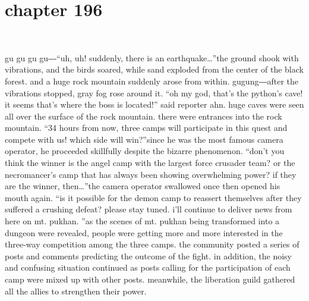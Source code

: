 \section{chapter 196}

                             




gu gu gu gu―“uh, uh! suddenly, there is an earthquake…”the ground shook with vibrations, and the birds soared, while sand exploded from the center of the black forest.
 and a huge rock mountain suddenly arose from within.
gugung―after the vibrations stopped, gray fog rose around it.
“oh my god, that’s the python’s cave! it seems that’s where the boss is located!” said reporter ahn.
huge caves were seen all over the surface of the rock mountain.
there were entrances into the rock mountain.
“34 hours from now, three camps will participate in this quest and compete with us! which side will win?”since he was the most famous camera operator, he proceeded skillfully despite the bizarre phenomenon.
“don’t you think the winner is the angel camp with the largest force crusader team? or the necromancer’s camp that has always been showing overwhelming power? if they are the winner, then…”the camera operator swallowed once then opened his mouth again.
“is it possible for the demon camp to reassert themselves after they suffered a crushing defeat? please stay tuned.
 i’ll continue to deliver news from here on mt.
 pukhan.
”as the scenes of mt.
 pukhan being transformed into a dungeon were revealed, people were getting more and more interested in the three-way competition among the three camps.
the community posted a series of posts and comments predicting the outcome of the fight.
 in addition, the noisy and confusing situation continued as posts calling for the participation of each camp were mixed up with other posts.
meanwhile, the liberation guild gathered all the allies to strengthen their power.

